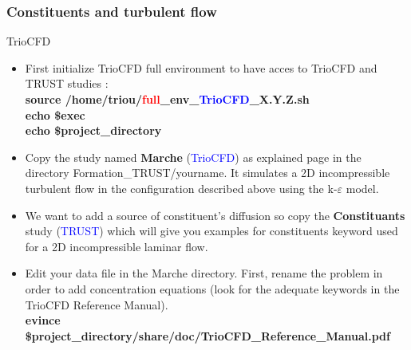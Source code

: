 \documentclass[10pt, hyperref={unicode=true,pdfusetitle, bookmarks=true,bookmarksnumbered=false,bookmarksopen=false, breaklinks=false,pdfborder={0 0 1},backref=true,colorlinks=true,linkcolor=darkblue,pageanchor}]{beamer}
\begin{document}
\begin{frame}
\frametitle{Constituents and turbulent flow}
\begin{block}{TrioCFD}

\begin{itemize}

\item First initialize TrioCFD full environment to have acces to TrioCFD and TRUST studies :\\
{\small{
\textbf{source /home/triou/\textcolor{red}{full}\_env\_\textcolor{blue}{TrioCFD}\_X.Y.Z.sh }\\
\textbf{echo \$exec} \\
\textbf{echo \$project\_directory} \\
}}

\item Copy the study named \textbf{Marche} (\textcolor{blue}{TrioCFD}) as explained page \pageref{method_copy} in the directory Formation\_TRUST/yourname. It simulates a 2D incompressible turbulent flow in the configuration described above using the k-$\varepsilon$ model.

\item We want to add a source of constituent's diffusion so copy the \textbf{Constituants} study (\textcolor{blue}{TRUST}) which will give you examples for constituents keyword used for a 2D incompressible laminar flow.

\item Edit your data file in the Marche directory. First, rename the problem in order to add concentration equations (look for the adequate keywords in the TrioCFD Reference Manual).\\
{\small{
\textbf{evince \$project\_directory/share/doc/TrioCFD\_Reference\_Manual.pdf}\\
}}

\end{itemize}

\end{block}
\end{frame}
\end{document}
